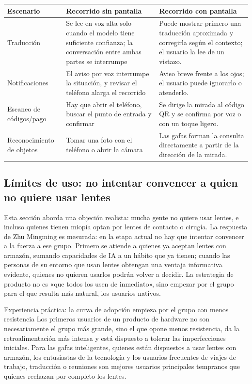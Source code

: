 \noindent\begin{tabularx}{\textwidth}{p{}p{}X}
\toprule
Escenario & Recorrido sin pantalla & Recorrido con pantalla \\
\midrule
Traducción & Se lee en voz alta solo cuando el modelo tiene suficiente confianza; la conversación entre ambas partes se interrumpe & Puede mostrar primero una traducción aproximada y corregirla según el contexto; el usuario la lee de un vistazo. \\
Notificaciones & El aviso por voz interrumpe la situación, y revisar el teléfono alarga el recorrido & Aviso breve frente a los ojos; el usuario puede ignorarlo o atenderlo. \\
Escaneo de códigos/pago & Hay que abrir el teléfono, buscar el punto de entrada y confirmar & Se dirige la mirada al código QR y se confirma por voz o con un toque ligero. \\
Reconocimiento de objetos & Tomar una foto con el teléfono o abrir la cámara & Las gafas forman la consulta directamente a partir de la dirección de la mirada. \\
\bottomrule
\end{tabularx}

\subsection{Límites de uso: no intentar convencer a quien no quiere usar lentes}

Esta sección aborda una objeción realista: mucha gente no quiere usar lentes, e incluso quienes tienen miopía optan por lentes de contacto o cirugía. La respuesta de Zhu Mingming es mesurada: en la etapa actual no hay que intentar convencer a la fuerza a ese grupo. Primero se atiende a quienes ya aceptan lentes con armazón, sumando capacidades de IA a un hábito que ya tienen; cuando las personas de su entorno que usan lentes obtengan una ventaja informativa evidente, quienes no quieren usarlos podrán volver a decidir. La estrategia de producto no es «que todos los usen de inmediato», sino empezar por el grupo para el que resulta más natural, los usuarios nativos.

\begin{knowledgebox}{Experiencia práctica: la curva de adopción empieza por el grupo con menos resistencia}
Los primeros usuarios de un producto de hardware no son necesariamente el grupo más grande, sino el que opone menos resistencia, da la retroalimentación más intensa y está dispuesto a tolerar las imperfecciones iniciales. Para las gafas inteligentes, quienes están dispuestos a usar lentes con armazón, los entusiastas de la tecnología y los usuarios frecuentes de viajes de trabajo, traducción o reuniones son mejores usuarios principales tempranos que quienes rechazan por completo los lentes.
\end{knowledgebox}

